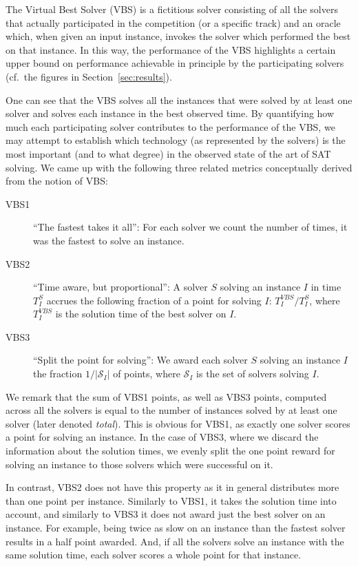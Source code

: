 \documentclass{elsarticle}
\begin{document}
\label{subsec:vbs_explained}

The Virtual Best Solver (VBS) is a fictitious solver consisting 
of all the solvers that actually participated in the competition (or a specific track)
and an oracle which, when given an input instance,
invokes  the  solver which performed the best on that instance.
In this way, the performance of the VBS highlights a certain upper bound 
on performance achievable in principle by the 
 participating solvers (cf.~the figures in Section~\ref{sec:results}). 

One can see that the VBS solves all the instances that
were solved by at least one solver and solves each instance in the best observed time.
By quantifying how much each participating solver contributes
to the performance of the VBS, we may attempt to establish which
technology (as represented by the solvers) is the most important
(and to what degree) in the observed state of the art of SAT solving.
We came up with the following three related metrics conceptually derived
from the notion of VBS:
\begin{description}
\item[VBS1]
``The fastest takes it all'':
For each solver we count the number of times, it was the fastest to solve an instance.
\item[VBS2]
``Time aware, but proportional'':
A solver $S$ solving an instance $I$ in time $T^S_I$ accrues 
the following fraction of a point for solving $I$:
$T^\mathit{VBS}_I/T^S_I$, where $T^\mathit{VBS}_I$ is the solution time of the best solver on $I$.
\item[VBS3]
``Split the point for solving'':
We award each solver $S$ solving an instance $I$ the fraction $1/|\mathcal{S}_I|$ of points, where
$\mathcal{S}_I$ is the set of solvers solving $I$.
\end{description}
We remark that the sum of VBS1 points, as well as VBS3 points, computed across all the solvers
is equal to the number of instances solved by at least one solver (later denoted \emph{total}).
This is obvious for VBS1, as exactly one solver scores a point for solving an instance.
In the case of VBS3, where we discard the information about the solution times, 
we evenly split the one point reward for solving an instance to those solvers which were successful on it.

In contrast, VBS2 does not have this property as it in general distributes more than one point per instance.
Similarly to VBS1, it takes the solution time into account,
and similarly to VBS3 it does not award just the best solver on an instance.
For example, being twice as slow on an instance than the fastest solver results in a half point awarded.
And, if all the solvers solve an instance with the same solution time,
each solver scores a whole point for that instance. 
\end{document}
